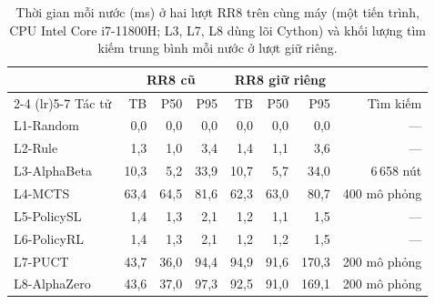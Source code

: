 \begin{table}[H]
  \centering\footnotesize
  \caption{Thời gian mỗi nước (ms) ở hai lượt RR8 trên cùng máy (một tiến trình, CPU Intel Core i7-11800H; L3, L7, L8 dùng lõi Cython) và khối lượng tìm kiếm trung bình mỗi nước ở lượt giữ riêng.}
  \label{tab:chi-phi-nuoc}
  \setlength{\tabcolsep}{4pt}
  \begin{tabular}{@{}lrrrrrrr@{}}
    \toprule
     & \multicolumn{3}{c}{RR8 cũ} & \multicolumn{3}{c}{RR8 giữ riêng} &  \\ \cmidrule(lr){2-4} \cmidrule(lr){5-7}
    Tác tử & TB & P50 & P95 & TB & P50 & P95 & Tìm kiếm \\
    \midrule
    L1-Random & 0{,}0 & 0{,}0 & 0{,}0 & 0{,}0 & 0{,}0 & 0{,}0 & --- \\
    L2-Rule & 1{,}3 & 1{,}0 & 3{,}4 & 1{,}4 & 1{,}1 & 3{,}6 & --- \\
    L3-AlphaBeta & 10{,}3 & 5{,}2 & 33{,}9 & 10{,}7 & 5{,}7 & 34{,}0 & 6\,658 nút \\
    L4-MCTS & 63{,}4 & 64{,}5 & 81{,}6 & 62{,}3 & 63{,}0 & 80{,}7 & 400 mô phỏng \\
    L5-PolicySL & 1{,}4 & 1{,}3 & 2{,}1 & 1{,}2 & 1{,}1 & 1{,}5 & --- \\
    L6-PolicyRL & 1{,}4 & 1{,}3 & 2{,}1 & 1{,}2 & 1{,}2 & 1{,}5 & --- \\
    L7-PUCT & 43{,}7 & 36{,}0 & 94{,}4 & 94{,}9 & 91{,}6 & 170{,}3 & 200 mô phỏng \\
    L8-AlphaZero & 43{,}6 & 37{,}0 & 97{,}3 & 92{,}5 & 91{,}0 & 169{,}1 & 200 mô phỏng \\
    \bottomrule
  \end{tabular}
\end{table}
